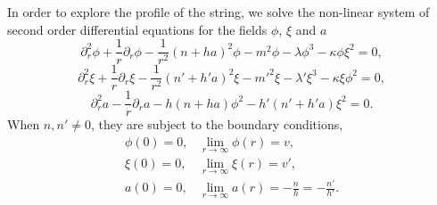 \documentclass[12pt,a4paper]{article}
\begin{document}
In order to explore the profile of the string, we solve the non-linear system of second order differential equations for the fields $\phi$, $\xi$ and $a$ 
\begin{equation}
	\partial_r^2 \phi + \frac{1}{r} \partial_r \phi- \frac{1}{r^2}\left(n+ha\right)^2\phi- m^2 \phi- \lambda \phi^3-\kappa \phi \xi^2 = 0,
\end{equation}
\begin{equation}
	\partial_r^2 \xi + \frac{1}{r} \partial_r \xi - \frac{1}{r^2}\left(n'+h'a \right)^2\xi -m'^2\xi - \lambda' \xi^3 - \kappa \xi \phi^2 = 0 ,
\end{equation}
\begin{equation}
	\partial_r^2a -\frac{1}{r}\partial_r a-h(n+ha)\phi^2-h'(n' + h'a )\xi^2 = 0.  
\end{equation}
When $n,n'\neq 0$, they are subject to the boundary conditions,
\begin{eqnarray}
	\phi(0)=0, & \displaystyle\lim_{r\to\infty}\phi(r) = v, \nonumber \\
	 \xi(0)=0, &  \displaystyle\lim_{r\to\infty}\xi(r) = v', \nonumber  \\
	 a(0)=0, & \displaystyle \lim_{r\to\infty}a(r) = -\frac{n}{h}=-\frac{n'}{h'}.
\end{eqnarray}



%
\end{document}
